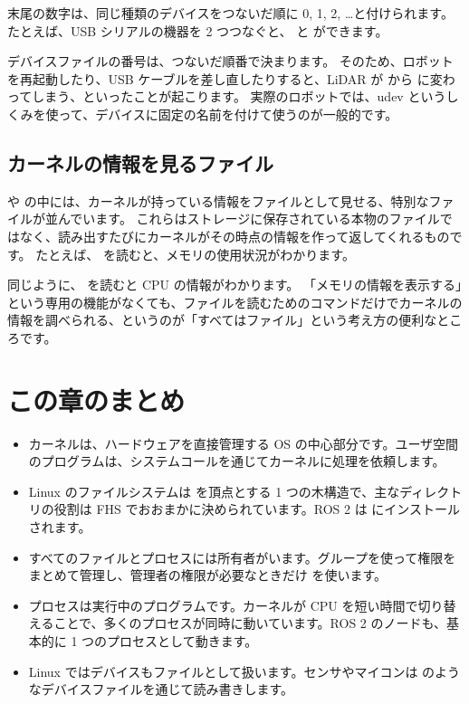 末尾の数字は、同じ種類のデバイスをつないだ順に 0, 1, 2, \ldots と付けられます。
たとえば、USB シリアルの機器を 2 つつなぐと、 と  ができます。

\begin{caution}[デバイスファイルの名前は変わることがある]
  デバイスファイルの番号は、つないだ順番で決まります。
  そのため、ロボットを再起動したり、USB ケーブルを差し直したりすると、LiDAR が  から  に変わってしまう、といったことが起こります。
  実際のロボットでは、udev というしくみを使って、デバイスに固定の名前を付けて使うのが一般的です。
\end{caution}

\subsection{カーネルの情報を見るファイル}

 や  の中には、カーネルが持っている情報をファイルとして見せる、特別なファイルが並んでいます。
これらはストレージに保存されている本物のファイルではなく、読み出すたびにカーネルがその時点の情報を作って返してくれるものです。
たとえば、 を読むと、メモリの使用状況がわかります。


同じように、 を読むと CPU の情報がわかります。
「メモリの情報を表示する」という専用の機能がなくても、ファイルを読むためのコマンドだけでカーネルの情報を調べられる、というのが「すべてはファイル」という考え方の便利なところです。

\section*{この章のまとめ}

\begin{itemize}
  \item カーネルは、ハードウェアを直接管理する OS の中心部分です。ユーザ空間のプログラムは、システムコールを通じてカーネルに処理を依頼します。
  \item Linux のファイルシステムは \cmd{/} を頂点とする 1 つの木構造で、主なディレクトリの役割は FHS でおおまかに決められています。ROS 2 は  にインストールされます。
  \item すべてのファイルとプロセスには所有者がいます。グループを使って権限をまとめて管理し、管理者の権限が必要なときだけ  を使います。
  \item プロセスは実行中のプログラムです。カーネルが CPU を短い時間で切り替えることで、多くのプロセスが同時に動いています。ROS 2 のノードも、基本的に 1 つのプロセスとして動きます。
  \item Linux ではデバイスもファイルとして扱います。センサやマイコンは  のようなデバイスファイルを通じて読み書きします。
\end{itemize}
